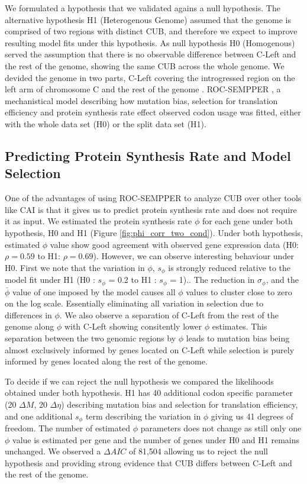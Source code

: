 \documentclass[12pt]{article}
\begin{document}
We formulated a hypothesis that we validated agains a null hypothesis. 
The alternative hypothesis H1 (Heterogenous Genome) assumed that the \kluyveri genome is comprised of two regions with distinct CUB, and therefore we expect to improve resulting model fits under this hypothesis. 
As null hypothesis H0 (Homogenous) served the assumption that there is no observable difference between C-Left and the rest of the \kluyveri genome, showing the same CUB across the whole genome.
We devided the \kluyveri genome in two parts, C-Left covering the introgressed region on the left arm of chromosome C and the rest of the \kluyveri genome \citep{payen2009}.
ROC-SEMPPER \citep{gilchrist2015}, a mechanistical model describing how mutation bias, selection for translation efficiency and protein synthesis rate effect observed codon usage was fitted, either with the whole data set (H0) or the split data set (H1).

\subsection*{Predicting Protein Synthesis Rate and Model Selection}
One of the advantages of using ROC-SEMPPER to analyze CUB over other tools like CAI \citep{sharp1987} is that it gives us to predict protein synthesis rate and does not require it as input.
We estimated the protein synthesis rate $\phi$ for each gene under both hypothesis, H0 and H1 (Figure \ref{fig:phi_corr_two_cond}). 
Under both hypothesis, estimated $\phi$ value show good agreement with observed gene expression data (H0: $\rho = 0.59$ to H1: $\rho = 0.69$).
However, we can observe interesting behaviour under H0.
First we note that the variation in $\phi$, $s_\phi$ is strongly reduced relative to the model fit under H1 (H0 : $s_{\phi}$ = 0.2 to H1 : $s_{\phi}$ = 1).. 
The reduction in $\sigma_\phi$, and the $\bar{\phi}$ value of one imposed by the model causes all $\phi$ values to cluster close to zero on the log scale. 
Essentially eliminating all variation in selection due to differences in $\phi$.
We also observe a separation of C-Left from the rest of the \kluyveri genome along $\phi$ with C-Left showing consitently lower $\phi$ estimates.
This separation between the two genomic regions by $\phi$ leads to mutation bias being almost exclusively informed by genes located on C-Left while selection is purely informed by genes located along the rest of the genome.

To decide if we can reject the null hypothesis we compared the likelihoods obtained under both hypothesis.
H1 has 40 additional codon specific parameter (20 $\Delta M$, 20 $\Delta \eta$) describing mutation bias and selection for translation efficiency, and one additional $s_\phi$ term describing the variation in $\phi$ giving us 41 degrees of freedom.
The number of estimated $\phi$ parameters does not change as still only one $\phi$ value is estimated per gene and the number of genes under H0 and H1 remains unchanged.
We observed a $\Delta AIC$ of 81,504 allowing us to reject the null hypothesis and providing strong evidence that CUB differs between C-Left and the rest of the \kluyveri genome.
\end{document}
